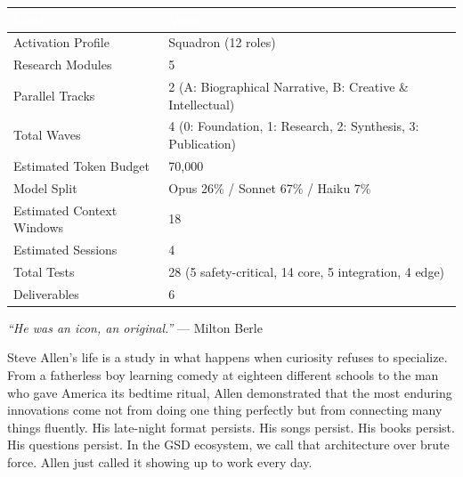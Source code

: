 \documentclass[11pt,letterpaper]{article}
\newcommand{\tableheader}[1]{\textbf{\sffamily\textcolor{white}{#1}}}
\begin{document}
\begin{center}
\begin{tabularx}{\textwidth}{L{5cm}X}
\toprule
{}
\tableheader{Metric} & \tableheader{Value} \\
\midrule
Activation Profile & Squadron (12 roles) \\
Research Modules & 5 \\
Parallel Tracks & 2 (A: Biographical Narrative, B: Creative \& Intellectual) \\
Total Waves & 4 (0: Foundation, 1: Research, 2: Synthesis, 3: Publication) \\
Estimated Token Budget & 70,000 \\
Model Split & Opus 26\% / Sonnet 67\% / Haiku 7\% \\
Estimated Context Windows & 18 \\
Estimated Sessions & 4 \\
Total Tests & 28 (5 safety-critical, 14 core, 5 integration, 4 edge) \\
Deliverables & 6 \\
\bottomrule
\end{tabularx}
\end{center}

\vspace{1em}

\begin{quotebox}
\textit{``He was an icon, an original.''} --- Milton Berle

\vspace{0.5em}

Steve Allen's life is a study in what happens when curiosity refuses to specialize. From a fatherless boy learning comedy at eighteen different schools to the man who gave America its bedtime ritual, Allen demonstrated that the most enduring innovations come not from doing one thing perfectly but from connecting many things fluently. His late-night format persists. His songs persist. His books persist. His questions persist. In the GSD ecosystem, we call that architecture over brute force. Allen just called it showing up to work every day.
\end{quotebox}
\end{document}

